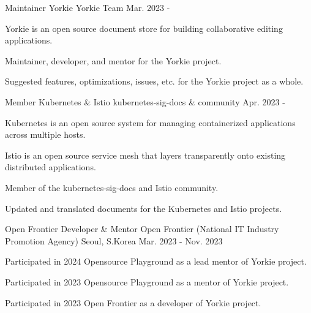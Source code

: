

\begin{cventries}

  \cventry
    {Maintainer} %
    {Yorkie} %
    {Yorkie Team} %
    {Mar. 2023 - } %
    {
      \begin{cvitems} %
        \item {Yorkie is an open source document store for building collaborative editing applications.}
        \item {Maintainer, developer, and mentor for the Yorkie project.}
        \item {Suggested features, optimizations, issues, etc. for the Yorkie project as a whole.}
      \end{cvitems}
    }

  \cventry
  {Member} %
  {Kubernetes \& Istio} %
  {kubernetes-sig-docs \& community} %
  {Apr. 2023 - } %
  {
    \begin{cvitems} %
      \item {Kubernetes is an open source system for managing containerized applications across multiple hosts.}
      \item {Istio is an open source service mesh that layers transparently onto existing distributed applications.}
      \item {Member of the kubernetes-sig-docs and Istio community.}
      \item {Updated and translated documents for the Kubernetes and Istio projects.}
    \end{cvitems}
  }

  \cventry
    {Open Frontier Developer \& Mentor} %
    {Open Frontier (National IT Industry Promotion Agency)} %
    {Seoul, S.Korea} %
    {Mar. 2023 - Nov. 2023} %
    {
      \begin{cvitems} %
        \item {Participated in 2024 Opensource Playground as a lead mentor of Yorkie project.}
        \item {Participated in 2023 Opensource Playground as a mentor of Yorkie project.}
        \item {Participated in 2023 Open Frontier as a developer of Yorkie project.}
      \end{cvitems}
    }


\end{cventries}
